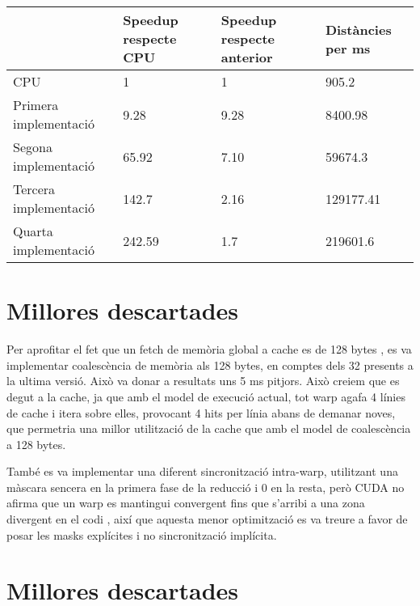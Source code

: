 \documentclass[catalan,10pt,a4paper]{article}
\begin{document}
\begin{table}[h]
\centering
\begin{tabular}{|l|l|l|l|}
\hline
      & Speedup respecte CPU & Speedup respecte anterior & Distàncies per ms \\ \hline
CPU & 1 & 1 & 905.2 \\ \hline
Primera implementació & 9.28 & 9.28 & 8400.98 \\ \hline
Segona implementació & 65.92 & 7.10 & 59674.3  \\ \hline
Tercera implementació & 142.7 & 2.16 & 129177.41  \\ \hline
Quarta implementació & 242.59 & 1.7 & 219601.6 \\ \hline

\end{tabular}
\end{table}

\newpage

\section*{Millores descartades}

Per aprofitar el fet que un fetch de memòria global a cache es de 128 bytes \cite{nvidiaDeveloperDoc}, es va implementar coalescència de memòria als 128 bytes, en comptes dels 32 presents a la ultima versió. Això va donar a resultats uns 5 ms pitjors. Això creiem que es degut a la cache, ja que amb el model de execució actual, tot warp agafa 4 línies de cache i itera sobre elles, provocant 4 hits per línia abans de demanar noves, que permetria una millor utilització de la cache que amb el model de coalescència a 128 bytes.

També es va implementar una diferent sincronització intra-warp, utilitzant una màscara sencera en la primera fase de la reducció i 0 en la resta, però CUDA no afirma que un warp es mantingui convergent fins que s'arribi a una zona divergent en el codi \cite{warpPrimitives}, així que aquesta menor optimització es va treure a favor de posar les masks explícites i no sincronització implícita.

\newpage

\section*{Millores descartades}

\newpage


\end{document}
